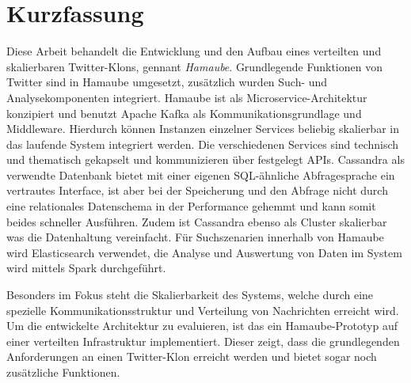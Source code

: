 


\newpage

\chapter*{Kurzfassung}
Diese Arbeit behandelt die Entwicklung und den Aufbau eines verteilten und skalierbaren Twitter-Klons, gennant \textit{Hamaube}. Grundlegende Funktionen von Twitter sind in Hamaube umgesetzt, zusätzlich wurden Such- und Analysekomponenten integriert. Hamaube ist als Microservice-Architektur konzipiert und benutzt Apache Kafka als Kommunikationsgrundlage und Middleware. Hierdurch können Instanzen einzelner Services beliebig skalierbar in das laufende System integriert werden. Die verschiedenen Services sind technisch und thematisch gekapselt und kommunizieren über festgelegt APIs.
 Cassandra als verwendte Datenbank bietet mit einer eigenen SQL-ähnliche Abfragesprache ein vertrautes Interface, ist aber bei der Speicherung und den Abfrage nicht durch eine relationales Datenschema in der Performance gehemmt und kann somit beides schneller Ausführen. Zudem ist Cassandra ebenso als Cluster skalierbar was die Datenhaltung vereinfacht. 
Für Suchszenarien innerhalb von Hamaube wird Elasticsearch verwendet, die Analyse und Auswertung von Daten im System wird mittels Spark durchgeführt.

Besonders im Fokus steht die Skalierbarkeit des Systems, welche durch eine spezielle Kommunikationsstruktur und Verteilung von Nachrichten erreicht wird. Um die entwickelte Architektur zu evaluieren, ist das ein Hamaube-Prototyp auf einer verteilten Infrastruktur implementiert. Dieser zeigt, dass die grundlegenden Anforderungen an einen Twitter-Klon erreicht werden und bietet sogar noch zusätzliche Funktionen.




\linespread{1.25}\selectfont

